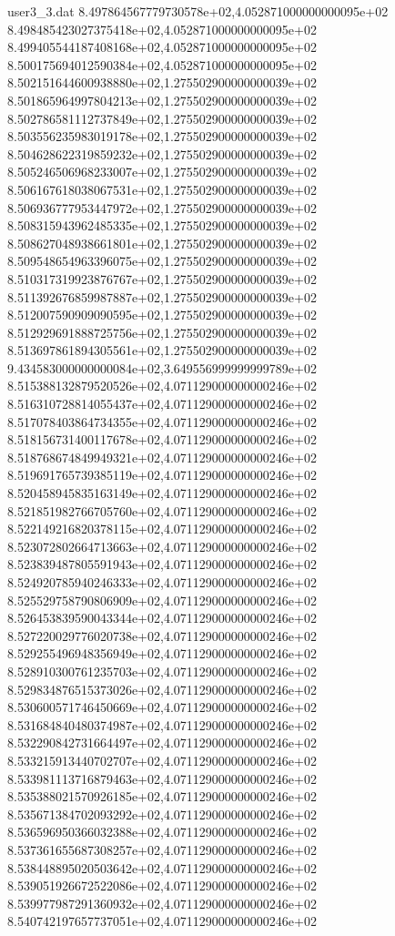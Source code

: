 \begin{filecontents}{user3_3.dat}
8.497864567779730578e+02,4.052871000000000095e+02
8.498485423027375418e+02,4.052871000000000095e+02
8.499405544187408168e+02,4.052871000000000095e+02
8.500175694012590384e+02,4.052871000000000095e+02
8.502151644600938880e+02,1.275502900000000039e+02
8.501865964997804213e+02,1.275502900000000039e+02
8.502786581112737849e+02,1.275502900000000039e+02
8.503556235983019178e+02,1.275502900000000039e+02
8.504628622319859232e+02,1.275502900000000039e+02
8.505246506968233007e+02,1.275502900000000039e+02
8.506167618038067531e+02,1.275502900000000039e+02
8.506936777953447972e+02,1.275502900000000039e+02
8.508315943962485335e+02,1.275502900000000039e+02
8.508627048938661801e+02,1.275502900000000039e+02
8.509548654963396075e+02,1.275502900000000039e+02
8.510317319923876767e+02,1.275502900000000039e+02
8.511392676859987887e+02,1.275502900000000039e+02
8.512007590909090595e+02,1.275502900000000039e+02
8.512929691888725756e+02,1.275502900000000039e+02
8.513697861894305561e+02,1.275502900000000039e+02
9.434583000000000084e+02,3.649556999999999789e+02
8.515388132879520526e+02,4.071129000000000246e+02
8.516310728814055437e+02,4.071129000000000246e+02
8.517078403864734355e+02,4.071129000000000246e+02
8.518156731400117678e+02,4.071129000000000246e+02
8.518768674849949321e+02,4.071129000000000246e+02
8.519691765739385119e+02,4.071129000000000246e+02
8.520458945835163149e+02,4.071129000000000246e+02
8.521851982766705760e+02,4.071129000000000246e+02
8.522149216820378115e+02,4.071129000000000246e+02
8.523072802664713663e+02,4.071129000000000246e+02
8.523839487805591943e+02,4.071129000000000246e+02
8.524920785940246333e+02,4.071129000000000246e+02
8.525529758790806909e+02,4.071129000000000246e+02
8.526453839590043344e+02,4.071129000000000246e+02
8.527220029776020738e+02,4.071129000000000246e+02
8.529255496948356949e+02,4.071129000000000246e+02
8.528910300761235703e+02,4.071129000000000246e+02
8.529834876515373026e+02,4.071129000000000246e+02
8.530600571746450669e+02,4.071129000000000246e+02
8.531684840480374987e+02,4.071129000000000246e+02
8.532290842731664497e+02,4.071129000000000246e+02
8.533215913440702707e+02,4.071129000000000246e+02
8.533981113716879463e+02,4.071129000000000246e+02
8.535388021570926185e+02,4.071129000000000246e+02
8.535671384702093292e+02,4.071129000000000246e+02
8.536596950366032388e+02,4.071129000000000246e+02
8.537361655687308257e+02,4.071129000000000246e+02
8.538448895020503642e+02,4.071129000000000246e+02
8.539051926672522086e+02,4.071129000000000246e+02
8.539977987291360932e+02,4.071129000000000246e+02
8.540742197657737051e+02,4.071129000000000246e+02

\end{filecontents}
